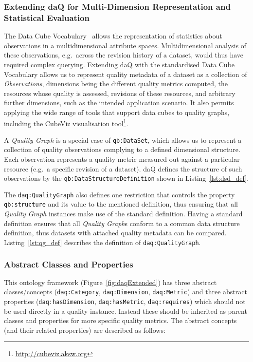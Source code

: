 \subsubsection{Extending daQ for Multi-Dimension Representation and Statistical Evaluation}
The Data Cube Vocabulary~\cite{w3c:REC-vocab-data-cube-20140116} allows the representation of statistics about observations in a multidimensional attribute spaces. 
Multidimensional analysis of these observations, e.g.\ across the revision history of a dataset, would thus have required complex querying.
Extending daQ with the standardised Data Cube Vocabulary allows us to represent quality metadata of a dataset as a collection of \emph{Observations}, dimensions being the different quality metrics computed, the resources whose quality is assessed, revisions of these resources, and arbitrary further dimensions, such as the intended application scenario.
It also permits applying the wide range of tools that support data cubes to quality graphs, including the  CubeViz visualisation tool\footnote{\url{http://cubeviz.aksw.org}}.

A \emph{Quality Graph} is a special case of \texttt{qb:DataSet}, which allows us to represent a collection of quality observations complying to  a defined dimensional structure.
Each observation represents a quality metric measured out against a particular resource (e.g.\ a specific revision of a dataset).
daQ defines the structure of such observations by the \texttt{qb:DataStructureDefinition} shown in Listing~\ref{lst:dsd_def}.


The \texttt{daq:QualityGraph} also defines one restriction that controls the property \texttt{qb:structure} and its value to the mentioned definition, thus ensuring that all \emph{Quality Graph} instances make use of the standard definition.
Having a standard definition ensures that all \emph{Quality Graph}s conform to a common data structure definition, thus datasets with attached quality metadata can be compared.
Listing~\ref{lst:qg_def} describes the definition of \texttt{daq:QualityGraph}.


\subsubsection{Abstract Classes and Properties}
This ontology framework (Figure~\ref{fig:daqExtended}) has three abstract classes/concepts (\texttt{daq:Category}, \texttt{daq:Dimension}, \texttt{daq:Metric}) and three abstract properties (\texttt{daq:hasDimension}, \texttt{daq:hasMetric}, \texttt{daq:requires}) which should not be used directly in a quality instance.
Instead these should be inherited as parent classes and properties for more specific quality metrics.
The abstract concepts (and their related properties) are described as follows:

